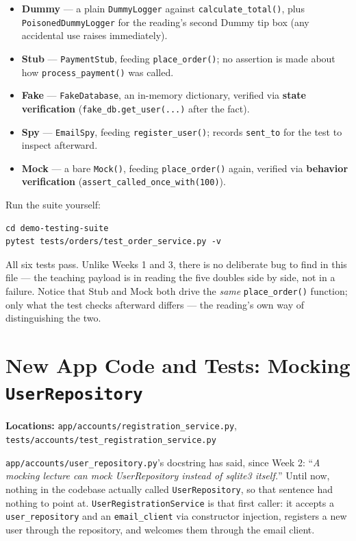 \documentclass[11pt]{article}
\begin{document}
\begin{itemize}
\item \textbf{Dummy} --- a plain \texttt{DummyLogger} against
\texttt{calculate\_total()}, plus \texttt{PoisonedDummyLogger} for the
reading's second Dummy tip box (any accidental use raises immediately).
\item \textbf{Stub} --- \texttt{PaymentStub}, feeding
\texttt{place\_order()}; no assertion is made about how
\texttt{process\_payment()} was called.
\item \textbf{Fake} --- \texttt{FakeDatabase}, an in-memory dictionary,
verified via \textbf{state verification}
(\texttt{fake\_db.get\_user(...)} after the fact).
\item \textbf{Spy} --- \texttt{EmailSpy}, feeding
\texttt{register\_user()}; records \texttt{sent\_to} for the test to
inspect afterward.
\item \textbf{Mock} --- a bare \texttt{Mock()}, feeding
\texttt{place\_order()} again, verified via \textbf{behavior
verification} (\texttt{assert\_called\_once\_with(100)}).
\end{itemize}

\begin{tipbox}
Run the suite yourself:
\begin{lstlisting}[style=shellstyle]
cd demo-testing-suite
pytest tests/orders/test_order_service.py -v
\end{lstlisting}
All six tests pass. Unlike Weeks 1 and 3, there is no deliberate bug to
find in this file --- the teaching payload is in reading the five
doubles side by side, not in a failure. Notice that Stub and Mock both
drive the \emph{same} \texttt{place\_order()} function; only what the
test checks afterward differs --- the reading's own way of distinguishing
the two.
\end{tipbox}

\section{New App Code and Tests: Mocking \texttt{UserRepository}}
\textbf{Locations:} \texttt{app/accounts/registration\_service.py},
\texttt{tests/accounts/test\_registration\_service.py}

\texttt{app/accounts/user\_repository.py}'s docstring has said, since
Week 2: ``\emph{A mocking lecture can mock UserRepository instead of
sqlite3 itself.}'' Until now, nothing in the codebase actually called
\texttt{UserRepository}, so that sentence had nothing to point at.
\texttt{UserRegistrationService} is that first caller: it accepts a
\texttt{user\_repository} and an \texttt{email\_client} via constructor
injection, registers a new user through the repository, and welcomes
them through the email client.
\end{document}
